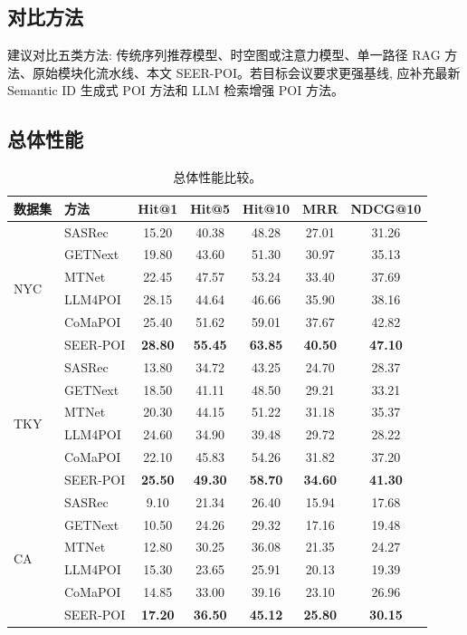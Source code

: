 \documentclass[10pt,twocolumn,fontset=none]{ctexart}
\newcommand{\method}{SEER-POI}
\begin{document}
\subsection{对比方法}
建议对比五类方法: 传统序列推荐模型、时空图或注意力模型、单一路径 RAG 方法、原始模块化流水线、本文 \method。若目标会议要求更强基线, 应补充最新 Semantic ID 生成式 POI 方法和 LLM 检索增强 POI 方法。

\subsection{总体性能}
\begin{table}[t]
\centering
\caption{总体性能比较。}
\label{tab:overall}
\small
\begin{tabular}{llccccc}
\toprule
数据集 & 方法 & Hit@1 & Hit@5 & Hit@10 & MRR & NDCG@10 \\
\midrule
\multirow{6}{*}{NYC} & SASRec & 15.20 & 40.38 & 48.28 & 27.01 & 31.26 \\
 & GETNext & 19.80 & 43.60 & 51.30 & 30.97 & 35.13 \\
 & MTNet & 22.45 & 47.57 & 53.24 & 33.40 & 37.69 \\
 & LLM4POI & 28.15 & 44.64 & 46.66 & 35.90 & 38.16 \\
 & CoMaPOI & 25.40 & 51.62 & 59.01 & 37.67 & 42.82 \\
 & \method & \textbf{28.80} & \textbf{55.45} & \textbf{63.85} & \textbf{40.50} & \textbf{47.10} \\
\midrule
\multirow{6}{*}{TKY} & SASRec & 13.80 & 34.72 & 43.25 & 24.70 & 28.37 \\
 & GETNext & 18.50 & 41.11 & 48.50 & 29.21 & 33.21 \\
 & MTNet & 20.30 & 44.15 & 51.22 & 31.18 & 35.37 \\
 & LLM4POI & 24.60 & 34.90 & 39.48 & 29.72 & 28.22 \\
 & CoMaPOI & 22.10 & 45.83 & 54.26 & 31.82 & 37.20 \\
 & \method & \textbf{25.50} & \textbf{49.30} & \textbf{58.70} & \textbf{34.60} & \textbf{41.30} \\
\midrule
\multirow{6}{*}{CA} & SASRec & 9.10 & 21.34 & 26.40 & 15.94 & 17.68 \\
 & GETNext & 10.50 & 24.26 & 29.32 & 17.16 & 19.48 \\
 & MTNet & 12.80 & 30.25 & 36.08 & 21.35 & 24.27 \\
 & LLM4POI & 15.30 & 23.65 & 25.91 & 20.13 & 19.39 \\
 & CoMaPOI & 14.85 & 33.00 & 39.16 & 23.10 & 26.96 \\
 & \method & \textbf{17.20} & \textbf{36.50} & \textbf{45.12} & \textbf{25.80} & \textbf{30.15} \\
\bottomrule
\end{tabular}
\end{table}
\end{document}
